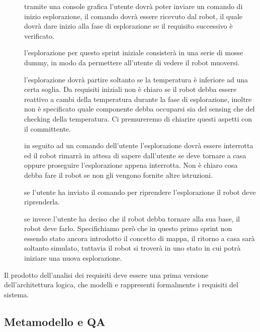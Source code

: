\begin{description}
  \item[]
    tramite una console grafica l'utente dovrà poter inviare un comando di inizio esplorazione, il comando dovrà essere ricevuto dal robot, il quale dovrà dare inizio alla fase di esplorazione se il requisito successivo è verificato.
  \item[]
    l'esplorazione per questo sprint iniziale consisterà in una serie di mosse dummy, in modo da permettere all'utente di vedere il robot muoversi.
  \item[]
    l'esplorazione dovrà partire soltanto se la temperatura è inferiore ad una certa soglia. Da requisiti iniziali non è chiaro se il robot debba essere reattivo a cambi della temperatura durante la fase di esplorazione, inoltre non è specificato quale componente debba occuparsi sia del sensing che del checking della temperatura. Ci premureremo di chiarire questi aspetti con il committente.
  \item[]
    in seguito ad un comando dell'utente l'esplorazione dovrà essere interrotta ed il robot rimarrà in attesa di sapere dall'utente se deve tornare a casa oppure proseguire l'esplorazione appena interrotta. Non è chiaro cosa debba fare il robot se non gli vengono fornite altre istruzioni.
  \item[]
    se l'utente ha inviato il comando per riprendere l'esplorazione il robot deve riprenderla.
  \item[]
    se invece l'utente ha deciso che il robot debba tornare alla sua base, il robot deve farlo. Specifichiamo però che in questo primo sprint non essendo stato ancora introdotto il concetto di mappa, il ritorno a casa sarà soltanto simulato, tuttavia il robot si troverà in uno stato in cui potrà iniziare una nuova esplorazione.
\end{description}


Il prodotto dell'analisi dei requisiti deve essere una prima versione dell'architettura logica, che modelli e rappresenti formalmente i requisiti del sistema.

\subsection{Metamodello e QA}

